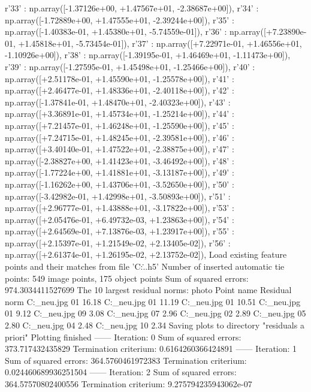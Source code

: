 r'33' : np.array([-1.37126e+00, +1.47567e+01, -2.38687e+00]),
r'34' : np.array([-1.72889e+00, +1.47555e+01, -2.39244e+00]),
r'35' : np.array([-1.40383e-01, +1.45380e+01, -5.74559e-01]),
r'36' : np.array([+7.23890e-01, +1.45818e+01, -5.73454e-01]),
r'37' : np.array([+7.22971e-01, +1.46556e+01, -1.10926e+00]),
r'38' : np.array([-1.39195e-01, +1.46469e+01, -1.11473e+00]),
r'39' : np.array([-1.27595e-01, +1.45498e+01, -1.25466e+00]),
r'40' : np.array([+2.51178e-01, +1.45590e+01, -1.25578e+00]),
r'41' : np.array([+2.46477e-01, +1.48336e+01, -2.40118e+00]),
r'42' : np.array([-1.37841e-01, +1.48470e+01, -2.40323e+00]),
r'43' : np.array([+3.36891e-01, +1.45734e+01, -1.25214e+00]),
r'44' : np.array([+7.21457e-01, +1.46248e+01, -1.25590e+00]),
r'45' : np.array([+7.24715e-01, +1.48245e+01, -2.39581e+00]),
r'46' : np.array([+3.40140e-01, +1.47522e+01, -2.38875e+00]),
r'47' : np.array([-2.38827e+00, +1.41423e+01, -3.46492e+00]),
r'48' : np.array([-1.77224e+00, +1.41881e+01, -3.13187e+00]),
r'49' : np.array([-1.16262e+00, +1.43706e+01, -3.52650e+00]),
r'50' : np.array([-3.42982e-01, +1.42998e+01, -3.50893e+00]),
r'51' : np.array([+2.96777e-01, +1.43888e+01, -3.17822e+00]),
r'53' : np.array([+2.05476e-01, +6.49732e-03, +1.23863e+00]),
r'54' : np.array([+2.64569e-01, +7.13876e-03, +1.23917e+00]),
r'55' : np.array([+2.15397e-01, +1.21549e-02, +2.13405e-02]),
r'56' : np.array([+2.61374e-01, +1.26195e-02, +2.13752e-02]),
Load existing feature points and their matches from file 'C:\Users\Clemens\PycharmProjects\PhotoVertiefungUe\python\..\features.h5'
Number of inserted automatic tie points: 549 image points, 175 object points
Sum of squared errors: 974.3034411527699
The 10 largest residual norms:
photo	Point name	Residual norm
C:\Users\Clemens\Desktop\fotos_neu\1.jpg	01	16.18
C:\Users\Clemens\Desktop\fotos_neu\4.jpg	01	11.19
C:\Users\Clemens\Desktop\fotos_neu\2.jpg	01	10.51
C:\Users\Clemens\Desktop\fotos_neu\3.jpg	01	9.12
C:\Users\Clemens\Desktop\fotos_neu\4.jpg	09	3.08
C:\Users\Clemens\Desktop\fotos_neu\4.jpg	07	2.96
C:\Users\Clemens\Desktop\fotos_neu\1.jpg	02	2.89
C:\Users\Clemens\Desktop\fotos_neu\4.jpg	05	2.80
C:\Users\Clemens\Desktop\fotos_neu\3.jpg	04	2.48
C:\Users\Clemens\Desktop\fotos_neu\4.jpg	10	2.34
Saving plots to directory "residuals a priori"
Plotting finished
------ Iteration: 0
Sum of squared errors: 373.717432435829
Termination criterium: 0.6164260366424891
------ Iteration: 1
Sum of squared errors: 364.5760461972383
Termination criterium: 0.024460689936251504
------ Iteration: 2
Sum of squared errors: 364.57570802400556
Termination criterium: 9.275794235943062e-07
